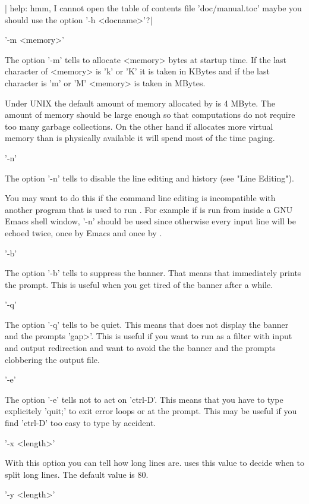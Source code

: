 |    help: hmm, I cannot open the table of contents file 'doc/manual.toc'
    maybe you should use the option '-h <docname>'?|

'-m <memory>'

The  option '-m' tells {\GAP} to  allocate <memory> bytes at startup time.
If  the last character of <memory> is 'k'  or 'K' it is taken in KBytes and
if the last character is 'm' or 'M' <memory> is taken in MBytes.

Under  UNIX the default amount  of memory allocated by  {\GAP} is 4 MByte.
The  amount of memory  should be large  enough so that  computations do not
require  too  many  garbage  collections.  On  the  other  hand  if {\GAP}
allocates  more virtual memory  than is physically  available it will spend
most of the time paging.

'-n'

The option  '-n'  tells {\GAP}  to disable  the line editing  and history
(see "Line Editing").

You  may want to do  this if the command  line editing is incompatible with
another  program that is used to run {\GAP}. For example if {\GAP} is run
from  inside a GNU Emacs shell window,  '-n' should be used since otherwise
every input line will be echoed twice, once by Emacs and once by {\GAP}.

'-b'

The  option  '-b'  tells  {\GAP}  to  suppress the banner. That means that
{\GAP} immediately prints the prompt. This is useful when you get tired of
the banner after a while.

'-q'

The option '-q' tells {\GAP} to be quiet. This means that {\GAP} does not
display  the banner and the  prompts 'gap>'. This is  useful if you want to
run {\GAP} as a filter with input and output redirection and want to avoid
the the banner and the prompts clobbering the output file.

'-e'

The  option '-e' tells {\GAP} not to  act on 'ctrl-D'. This means that you
have  to type  explicitely 'quit;'  to exit  error loops  or {\GAP} at the
prompt.  This  may  be  useful  if  you  find  'ctrl-D' too easy to type by
accident.

'-x <length>'

With this option you can tell {\GAP} how long lines are. {\GAP} uses this
value to decide when to split long lines. The  default value is 80.

'-y <length>'

